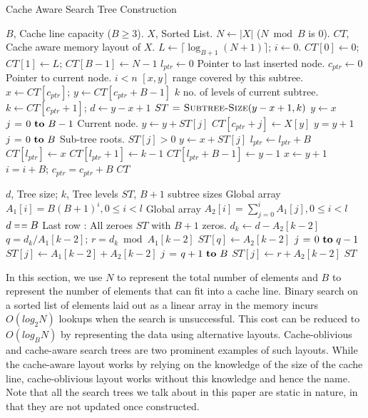 \documentclass[10pt, conference]{IEEEtran}
\begin{document}
\begin{algorithm}
\caption{Cache Aware Search Tree Construction\label{alg:caware}}
\begin{codebox}
\zi {} $B$, Cache line capacity ($B \geq 3$).
\zi {} $X$, Sorted List. $N \gets |X|$ ($N \bmod{B}$ is $0$).
\zi {} $CT$, Cache aware memory layout of $X$.
\li $L \gets \lceil \log_{B+1} (N+1) \rceil$; $i \gets 0$.
\li $CT[0] \gets 0$; $CT[1] \gets L$; $CT[B-1] \gets N-1$
\li $l_{ptr} \gets 0$ \Comment Pointer to last inserted node.
\li $c_{ptr} \gets 0$ \Comment Pointer to current node.
\li \While $i < n$
    \Do
\zi      \Comment $[x,y]$ range covered by this subtree.
\li      $x \gets CT[c_{ptr}]$; \quad $y \gets CT[c_{ptr}+B-1]$
\zi      \Comment $k$ no. of levels of current subtree.
\li      $k \gets CT[c_{ptr} + 1]$; \quad $d \gets y - x + 1$
\li      $ST \mathrel{\hspace{1pt}=\hspace{1pt}} \textnormal{\scshape Subtree-Size}(y - x + 1, k)$
\li      $y \gets x$
\li      \For $j \gets 0 \To B - 1$ \Comment Current node.
         \Do
\li           $y \gets y + ST[j]$
\li           $CT[c_{ptr} + j] \gets X[y]$
\li           $y = y + 1$
         \End
\li      \For $j \gets 0 \To B$ \Comment Sub-tree roots.
         \Do
\li           \If $ST[j] > 0$
              \Do
\li               $y \gets x + ST[j]$
\li               $l_{ptr} \gets l_{ptr} + B$
\li               $CT[l_{ptr}] \gets x$
\li               $CT[l_{ptr} + 1] \gets k - 1$
\li               $CT[l_{ptr} + B - 1] \gets y - 1$
\li               $x \gets y + 1$
              \End
        \End
\li     $i = i + B$; $c_{ptr} = c_{ptr} + B$
    \End
\li \Return $CT$
\end{codebox}
\begin{codebox}
\zi {} $d$, Tree size; $k$, Tree levels
\zi {}  $ST$, $B+1$ subtree sizes
\zi Global array $A_1[i] = B(B+1)^{i}, 0 \leq i < l$
\zi Global array $A_2[i] = \sum_{j = 0}^i A_1[j], 0 \leq i < l$
\li \If $d \isequal B$ \Comment Last row : All zeroes
\li \Then \Return $ST$ with $B+1$ zeros. \End
\li $d_k \gets d - A_2[k - 2]$
\li $q = d_k / A_1[k - 2]$; $r = d_k \bmod A_1[k - 2]$
\li $ST[q] \gets A_2[k - 2]$
\li \For $j \gets 0 \To q-1$
\li \Do $ST[j] \gets A_1[k - 2] + A_2[k - 2]$ \End
\li \For $j \gets q+1 \To B$
\li \Do $ST[j] \gets r + A_2[k-2]$ \End
\li \Return $ST$
\end{codebox}
\end{algorithm}

In this section, we use $N$ to represent the total number of elements and $B$ to represent the number of elements that can fit into a cache line. Binary search on a sorted list of elements laid out as a linear array in the memory incurs $O(log_2N)$ lookups when the search is unsuccessful. This cost can be reduced to $O(log_BN)$ by representing the data using alternative layouts. Cache-oblivious and cache-aware search trees are two prominent examples of such layouts. While the cache-aware layout works by relying on the knowledge of the size of the cache line, cache-oblivious layout works without this knowledge and hence the name. Note that all the search trees we talk about in this paper are static in nature, in that they are not updated once constructed.
\end{document}
